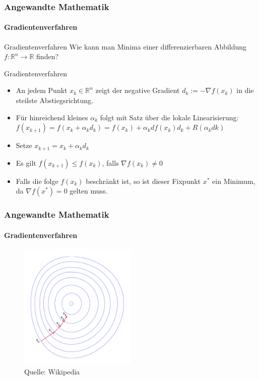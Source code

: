 \documentclass{beamer}
\begin{document}
\begin{frame}
    \frametitle{Angewandte Mathematik}
\framesubtitle{Gradientenverfahren}
    \begin{block}{Gradientenverfahren}
Wie kann man Minima einer  differenzierbaren Abbildung $f: \mathbb{R}^n \to \mathbb{R}$ finden? 
 
\end{block}

    \begin{block}{Gradientenverfahren}
\begin{itemize}
\item An jedem Punkt $x_k \in  \mathbb{R}^n$ zeigt der negative Gradient  $d_k := -\nabla f (x_k)$ in die steilste Abstiegsrichtung.
\item Für hinreichend kleines $\alpha_k$ folgt mit Satz über die lokale Linearisierung:
$f(x_{k+1}) = f (x_k + \alpha_k d_k) =  f(x_k) + \alpha_k df(x_k)d_k + R( \alpha_k dk)$
\item  Setze $x_{k+1} = x_k + \alpha_k d_k$ 
\item Es gilt $f(x_{k+1}) \leq f(x_k)$, falls $\nabla f(x_k) \neq 0$
\item  Falls die folge $f(x_k)$ beschränkt ist, so ist  dieser Fixpunkt $x^*$ ein Minimum, da $\nabla f(x^*) = 0$ gelten muss.  
\end{itemize}

\end{block}
 \end{frame}



\begin{frame}
    \frametitle{Angewandte Mathematik}
\framesubtitle{Gradientenverfahren}
\begin{figure}[H]
      \centering
    \includegraphics[width=0.5\textwidth]{images/Gradient_descent}
      \caption{Quelle: Wikipedia}
\end{figure}

 \end{frame}
\end{document}
